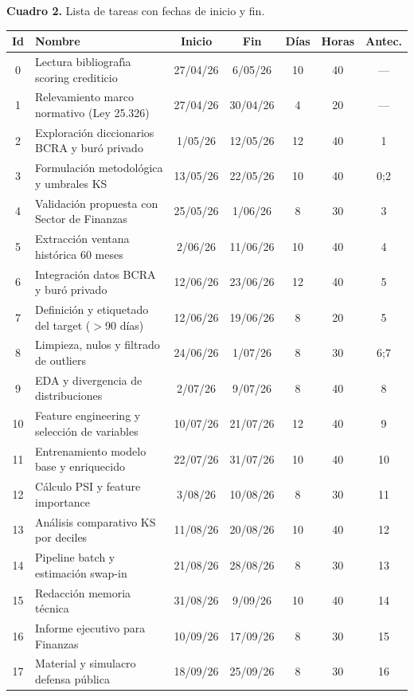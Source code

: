 \documentclass[
11pt, %
]{charter}
\begin{document}
\begin{center}
{\small \textbf{Cuadro 2.} Lista de tareas con fechas de inicio y fin.}

\vspace{0.2cm}
\scriptsize
\setlength{\tabcolsep}{4pt}
\begin{tabular}{|c|p{6.5cm}|c|c|c|c|c|}
\hline
\rowcolor[HTML]{C0C0C0}
\textbf{Id} & \textbf{Nombre} & \textbf{Inicio} & \textbf{Fin} & \textbf{D\'ias} & \textbf{Horas} & \textbf{Antec.} \\ \hline
0  & Lectura bibliograf\'{\i}a scoring crediticio          & 27/04/26 & 6/05/26  & 10 & 40 & ---  \\ \hline
1  & Relevamiento marco normativo (Ley 25.326)            & 27/04/26 & 30/04/26 & 4  & 20 & ---  \\ \hline
2  & Exploraci\'on diccionarios BCRA y bur\'o privado & 1/05/26  & 12/05/26 & 12 & 40 & 1    \\ \hline
3  & Formulaci\'on metodol\'ogica y umbrales KS       & 13/05/26 & 22/05/26 & 10 & 40 & 0;2  \\ \hline
4  & Validaci\'on propuesta con Sector de Finanzas      & 25/05/26 & 1/06/26  & 8  & 30 & 3    \\ \hline
5  & Extracci\'on ventana hist\'orica 60 meses        & 2/06/26  & 11/06/26 & 10 & 40 & 4    \\ \hline
6  & Integraci\'on datos BCRA y bur\'o privado        & 12/06/26 & 23/06/26 & 12 & 40 & 5    \\ \hline
7  & Definici\'on y etiquetado del target ($>$90 d\'ias) & 12/06/26 & 19/06/26 & 8 & 20 & 5 \\ \hline
8  & Limpieza, nulos y filtrado de outliers               & 24/06/26 & 1/07/26  & 8  & 30 & 6;7  \\ \hline
9  & EDA y divergencia de distribuciones                  & 2/07/26  & 9/07/26  & 8  & 40 & 8    \\ \hline
10 & Feature engineering y selecci\'on de variables     & 10/07/26 & 21/07/26 & 12 & 40 & 9    \\ \hline
11 & Entrenamiento modelo base y enriquecido              & 22/07/26 & 31/07/26 & 10 & 40 & 10   \\ \hline
12 & C\'alculo PSI y feature importance                 & 3/08/26  & 10/08/26 & 8  & 30 & 11   \\ \hline
13 & An\'alisis comparativo KS por deciles              & 11/08/26 & 20/08/26 & 10 & 40 & 12   \\ \hline
14 & Pipeline batch y estimaci\'on swap-in              & 21/08/26 & 28/08/26 & 8  & 30 & 13   \\ \hline
15 & Redacci\'on memoria t\'ecnica                    & 31/08/26 & 9/09/26  & 10 & 40 & 14   \\ \hline
16 & Informe ejecutivo para Finanzas                      & 10/09/26 & 17/09/26 & 8  & 30 & 15   \\ \hline
17 & Material y simulacro defensa p\'ublica             & 18/09/26 & 25/09/26 & 8  & 30 & 16   \\ \hline
\end{tabular}
\end{center}
\end{document}
